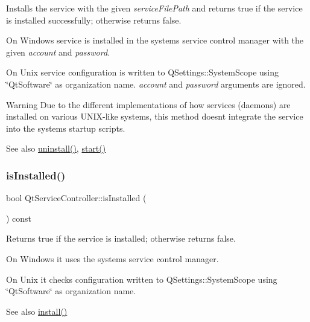 Installs the service with the given {\itshape service\+File\+Path} and returns true if the service is installed successfully; otherwise returns false.

On Windows service is installed in the system\textquotesingle{}s service control manager with the given {\itshape account} and {\itshape password}.

On Unix service configuration is written to Q\+Settings\+::\+System\+Scope using \char`\"{}\+Qt\+Software\char`\"{} as organization name. {\itshape account} and {\itshape password} arguments are ignored.

\begin{DoxyWarning}{Warning}
Due to the different implementations of how services (daemons) are installed on various U\+N\+I\+X-\/like systems, this method doesn\textquotesingle{}t integrate the service into the system\textquotesingle{}s startup scripts.
\end{DoxyWarning}
\begin{DoxySeeAlso}{See also}
\hyperlink{class_qt_service_controller_a25cd2f1f6868ece5de77976eb55cb74c}{uninstall()}, \hyperlink{class_qt_service_controller_a5e9d6da5081d70f31611456d0ef0687e}{start()} 
\end{DoxySeeAlso}
\mbox{\label{class_qt_service_controller_a7e36fb18a273118709faf22f732feac4}} 
\subsubsection{\texorpdfstring{is\+Installed()}{isInstalled()}}
{\footnotesize\ttfamily bool Qt\+Service\+Controller\+::is\+Installed (\begin{DoxyParamCaption}{ }\end{DoxyParamCaption}) const}

Returns true if the service is installed; otherwise returns false.

On Windows it uses the system\textquotesingle{}s service control manager.

On Unix it checks configuration written to Q\+Settings\+::\+System\+Scope using \char`\"{}\+Qt\+Software\char`\"{} as organization name.

\begin{DoxySeeAlso}{See also}
\hyperlink{class_qt_service_controller_a7e2b85e911ff152557dd25959e76094b}{install()} 
\end{DoxySeeAlso}
\mbox{\label{class_qt_service_controller_a4a11b35468848388174a36af66f25fc3}} 
